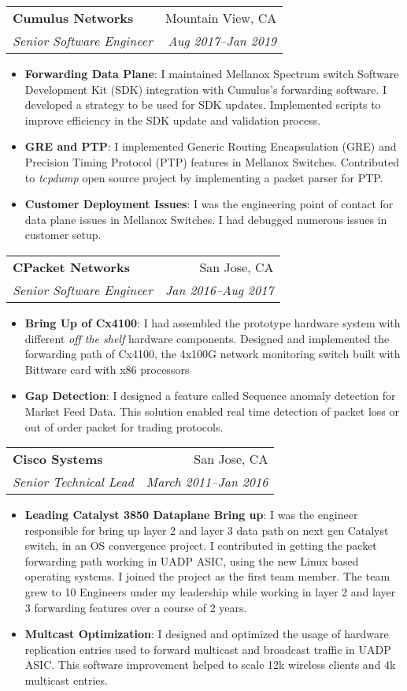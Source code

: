 \documentclass[letterpaper,12pt]{article}
\makeatletter
\newcommand{\resumeItem}[2]{
  \item\small{
    \textbf{#1}{: #2 \vspace{-2pt}}
  }
}
\newcommand{\resumeSubheading}[4]{
  \vspace{-1pt}\item
    \begin{tabular*}{0.97\textwidth}[t]{l@{\extracolsep{\fill}}r}
      \textbf{#1} & #2 \\
      \textit{\small#3} & \textit{\small #4} \\
    \end{tabular*}\vspace{-5pt}
}
\newcommand{\resumeItemListStart}{\begin{itemize}}
\newcommand{\resumeItemListEnd}{\end{itemize}\vspace{-5pt}}
\makeatother
\begin{document}
    \resumeSubheading
      {Cumulus Networks}{Mountain View, CA}
      {Senior Software Engineer}{Aug 2017–Jan 2019}
      \resumeItemListStart
        \resumeItem{Forwarding Data Plane}
          {I maintained Mellanox Spectrum switch Software Development Kit (SDK) integration with Cumulus's forwarding software. I developed a strategy to be used for SDK updates. Implemented scripts to improve efficiency in the SDK update and validation process.}
        \resumeItem{GRE and PTP}
          {I implemented Generic Routing Encapsulation (GRE) and Precision Timing Protocol (PTP) features in Mellanox Switches. Contributed to \textit{tcpdump} open source project by implementing a packet parser for PTP.}
        \resumeItem{Customer Deployment Issues}
          {I was the engineering point of contact for data plane issues in Mellanox Switches. I had debugged numerous issues in customer setup.}
      \resumeItemListEnd

    \resumeSubheading
      {CPacket Networks}{San Jose, CA}
      {Senior Software Engineer}{Jan 2016–Aug 2017}
      \resumeItemListStart
        \resumeItem{Bring Up of Cx4100}
          {I had assembled the prototype hardware system with different \textit{off the shelf} hardware components. Designed and implemented the forwarding path of Cx4100, the 4x100G  network monitoring switch built with Bittware card with x86 processors}
        \resumeItem{Gap Detection}
          {I designed a feature called Sequence anomaly detection for Market Feed Data. This solution enabled real time detection of packet loss or out of order packet for trading protocols.}
      \resumeItemListEnd

    \resumeSubheading
      {Cisco Systems}{San Jose, CA}
      {Senior Technical Lead}{March 2011–Jan 2016}
      \resumeItemListStart
        \resumeItem{Leading Catalyst 3850 Dataplane Bring up}
          {I was the engineer responsible for bring up layer 2 and layer 3 data path on next gen Catalyst switch, in an OS convergence project. I contributed in getting the packet forwarding path working in UADP ASIC, using the new Linux based operating systems. I joined the project as the first team member. The team grew to 10 Engineers under my leadership while working in layer 2 and layer 3 forwarding features over a course of 2 years.}
          
        \resumeItem{Multcast Optimization}
          {I designed and optimized the usage of hardware replication entries used to forward multicast and broadcast traffic in UADP ASIC. This software improvement helped to scale 12k wireless clients and 4k multicast entries.}
      \resumeItemListEnd
            
\end{document}
